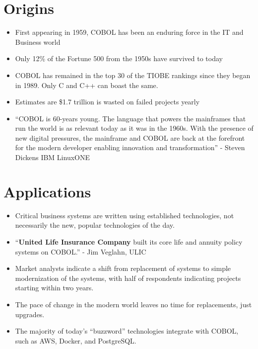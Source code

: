 \documentclass[12pt]{article}
\begin{document}
\section{Origins}

\begin{itemize}

    \item First appearing in 1959, COBOL has been an enduring force in the IT and Business world
    \item Only 12\% of the Fortune 500 from the 1950s have survived to today
    \item COBOL has remained in the top 30 of the TIOBE rankings since they began in 1989. Only C and C++ can boast the same.
    \item Estimates are \$1.7 trillion is wasted on failed projects yearly
    \item ``COBOL is 60-years young. The language that powers the mainframes that run the world is as relevant today as it was in the 1960s. With the presence of new digital pressures, the mainframe and COBOL are back at the forefront for the modern developer enabling innovation and transformation'' - Steven Dickens IBM LinuxONE


\end{itemize}



\section{Applications}

\begin{itemize}

    \item Critical business systems are written using established technologies, not necessarily the new, popular technologies of the day.
    \item ``\textbf{United Life Insurance Company} built its core life and annuity policy systems on COBOL.'' - Jim Veglahn, ULIC

    \item Market analysts indicate a shift from replacement of systems to simple modernization of the systems, with half of respondents indicating projects starting within two years.
    \item The pace of change in the modern world leaves no time for replacements, just upgrades.
    \item The majority of today's ``buzzword'' technologies integrate with COBOL, such as AWS, Docker, and PostgreSQL.

\end{itemize}
\end{document}
